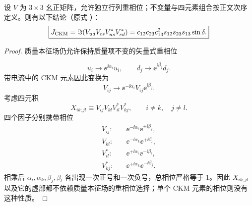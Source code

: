 \begin{proposition}[三阶幺正混合矩阵的重相位不变量]
设 $V$ 为 $3\times3$ 幺正矩阵，允许独立行列重相位；不变量与四元素组合按正文次序定义。则有以下结论（原式 ）：
\begin{equation*}
 \boxed{
 J_{\rm CKM}
 =\Im\!\left(V_{ud}V_{cs}V_{us}^*V_{cd}^*\right)
 =c_{12}c_{23}c_{13}^2s_{12}s_{23}s_{13}\sin\delta.}
\end{equation*}
\end{proposition}
\begin{proof}
质量本征场仍允许保持质量项不变的矢量式重相位

\begin{equation*}
 u_i\to \ee^{\ii\alpha_i}u_i,
 \qquad
 d_j\to \ee^{\ii\beta_j}d_j.
\end{equation*}
带电流中的 CKM 元素因此变换为
\begin{equation*}
 V_{ij}\to
 \ee^{-\ii\alpha_i}V_{ij}\ee^{\ii\beta_j}.
\end{equation*}
考虑四元积
\begin{equation*}
 X_{ik;jl}\equiv V_{ij}V_{kl}V_{il}^*V_{kj}^*,
 \qquad i\neq k,
 \quad j\neq l.
\end{equation*}
四个因子分别携带相位
\begin{align*}
 V_{ij}:&\quad \ee^{-\ii\alpha_i}\ee^{+\ii\beta_j},\\
 V_{kl}:&\quad \ee^{-\ii\alpha_k}\ee^{+\ii\beta_l},\\
 V_{il}^*:&\quad \ee^{+\ii\alpha_i}\ee^{-\ii\beta_l},\\
 V_{kj}^*:&\quad \ee^{+\ii\alpha_k}\ee^{-\ii\beta_j}.
\end{align*}
相乘后 $\alpha_i,\alpha_k,\beta_j,\beta_l$ 各出现一次正号和一次负号，总相位严格等于 $1$。因此 $X_{ik;jl}$ 以及它的虚部都不依赖质量本征场的重相位选择；单个 CKM 元素的相位则没有这种性质。


\end{proof}
